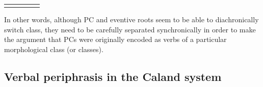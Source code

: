 \documentclass[output=paper,colorlinks,citecolor=brown]{langscibook}
\begin{document}
\begin{table}
\begin{tabularx}{\textwidth}{lllll}
  \lspbottomrule
 \end{tabularx}
\end{table}

 In other words, although PC and eventive roots seem to be able to diachronically switch class, they need to be carefully separated synchronically in order to make the argument that PCs were originally encoded as verbs of a particular morphological class (or classes). 


\subsection{Verbal periphrasis in the Caland system} \label{sec:CSperiphrasis}
\end{document}
